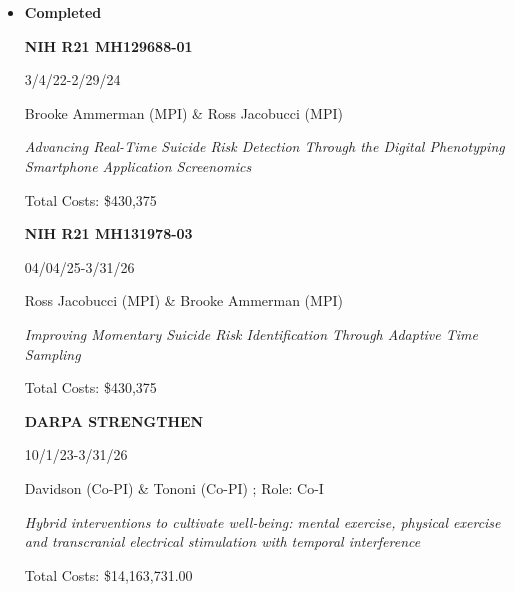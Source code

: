 \documentclass[letterpaper,10pt]{article}
\begin{document}
\begin{itemize}
	\item{\textbf{\large{Completed}}}
	
		\begin{center}
		\noindent\parbox{0.7\textwidth}{\raggedright \textbf{NIH R21 MH129688-01}}\hfill%
		\parbox{0.2\textwidth}{\raggedright 3/4/22-2/29/24}
		\parbox{6.5in}{{Brooke Ammerman (MPI) \& Ross Jacobucci (MPI) }  }
		\parbox{6.5in}{\textit{Advancing Real-Time Suicide Risk Detection Through the Digital Phenotyping Smartphone Application Screenomics}}
		\parbox{6.5in}{Total Costs: \$430,375}
	\end{center}
	
	\begin{center}
		\noindent\parbox{0.7\textwidth}{\raggedright \textbf{NIH R21 MH131978-03}}\hfill%
		\parbox{0.2\textwidth}{\raggedright 04/04/25-3/31/26}
		\parbox{6.5in}{{Ross Jacobucci (MPI) \& Brooke Ammerman (MPI)}  }
		\parbox{6.5in}{\textit{Improving Momentary Suicide Risk Identification Through Adaptive Time Sampling}}
		\parbox{6.5in}{Total Costs: \$430,375}
	\end{center}
	
	
	\begin{center}
		\noindent\parbox{0.7\textwidth}{\raggedright \textbf{DARPA STRENGTHEN}}\hfill%
		\parbox{0.2\textwidth}{\raggedright 10/1/23-3/31/26}
		\parbox{6.5in}{{Davidson (Co-PI) \& Tononi (Co-PI) }; Role: Co-I  }
		\parbox{6.5in}{\textit{Hybrid interventions to cultivate well-being: mental exercise, physical exercise and transcranial electrical stimulation with temporal interference}}
		\parbox{6.5in}{Total Costs: \$14,163,731.00}
	\end{center}
	
	

\end{itemize}
\end{document}
